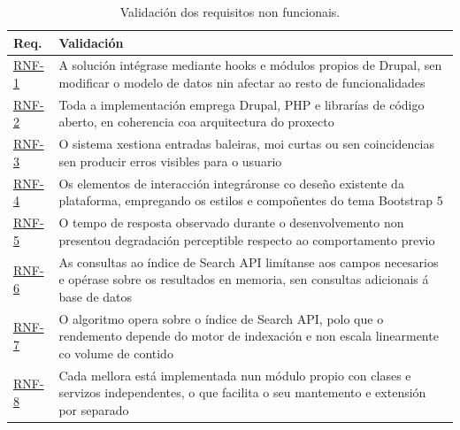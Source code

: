 \documentclass[%
    a4paper,               %
    twoside,               %
    10pt,                  %
]{article}                 %
\begin{document}
\begin{table}[h]
    \centering
    \begin{tabular}{p{1.5cm} p{\dimexpr\linewidth-1.5cm-4\tabcolsep\relax}}
        \hline
        \textbf{Req.}              & \textbf{Validación}                                                                                                                                     \\
        \hline
        \hyperref[req:rnf1]{RNF-1} & A solución intégrase mediante hooks e módulos propios de Drupal, sen modificar o modelo de datos nin afectar ao resto de funcionalidades                \\
        \hyperref[req:rnf2]{RNF-2} & Toda a implementación emprega Drupal, PHP e librarías de código aberto, en coherencia coa arquitectura do proxecto                                      \\
        \hyperref[req:rnf3]{RNF-3} & O sistema xestiona entradas baleiras, moi curtas ou sen coincidencias sen producir erros visibles para o usuario                                        \\
        \hyperref[req:rnf4]{RNF-4} & Os elementos de interacción integráronse co deseño existente da plataforma, empregando os estilos e compoñentes do tema Bootstrap 5                     \\
        \hyperref[req:rnf5]{RNF-5} & O tempo de resposta observado durante o desenvolvemento non presentou degradación perceptible respecto ao comportamento previo                          \\
        \hyperref[req:rnf6]{RNF-6} & As consultas ao índice de Search API limítanse aos campos necesarios e opérase sobre os resultados en memoria, sen consultas adicionais á base de datos \\
        \hyperref[req:rnf7]{RNF-7} & O algoritmo opera sobre o índice de Search API, polo que o rendemento depende do motor de indexación e non escala linearmente co volume de contido      \\
        \hyperref[req:rnf8]{RNF-8} & Cada mellora está implementada nun módulo propio con clases e servizos independentes, o que facilita o seu mantemento e extensión por separado          \\
        \hline
    \end{tabular}
    \caption{Validación dos requisitos non funcionais.}
    \label{tab:validacion_rnf}
\end{table}

\end{document}
